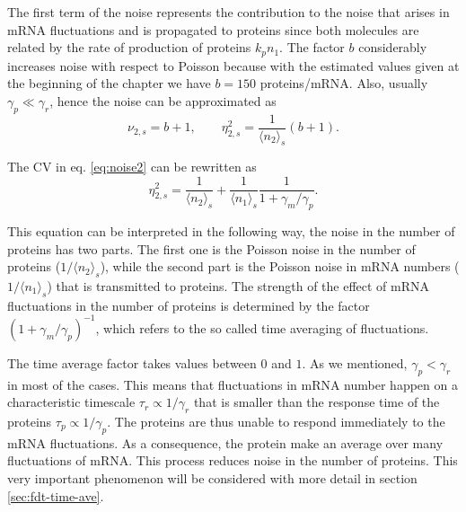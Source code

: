 The first term of the noise represents the contribution to the noise that arises in mRNA fluctuations and is propagated to proteins since both molecules are related by the rate of production of proteins $k_pn_1$. The factor $b$ considerably increases noise with respect to Poisson because with the estimated values given at the beginning of the chapter we have $b=150$ proteins/mRNA. Also, usually $\gamma_p \ll \gamma_r$, hence the noise can be approximated as
\begin{equation*}
  \nu_{2,s} = b+1, \quad \quad \eta_{2,s}^2 = \frac{1}{\langle n_2\rangle_s}\left(b+1\right).
\end{equation*}

The CV in eq. \eqref{eq:noise2} can be rewritten as
\begin{equation*}
  \eta_{2,s}^2 = \frac{1}{\langle n_2\rangle_s}+\frac{1}{\langle n_1\rangle_s}\frac{1}{1+\gamma_m/\gamma_p}.
\end{equation*}

This equation can be interpreted in the following way, the noise in the number of proteins has two parts. The first one is the Poisson noise in the number of proteins ($1/\langle n_2\rangle_s$), while the second part is the Poisson noise in mRNA numbers ($1/\langle n_1\rangle_s$) that is transmitted to proteins. The strength of the effect of mRNA fluctuations in the number of proteins is determined by the factor $(1+\gamma_m/\gamma_p)^{-1}$, which refers to the so called time averaging of fluctuations.

The time average factor takes values between $0$ and $1$. As we mentioned, $\gamma_p<\gamma_r$ in most of the cases. This means that fluctuations in mRNA number happen on a characteristic timescale $\tau_r \propto 1/\gamma_r$  that is smaller than the response time of the proteins $\tau_p \propto 1/\gamma_p$. The proteins are thus unable to respond immediately to the mRNA fluctuations. As a consequence, the protein make an average over many fluctuations of mRNA. This process reduces noise in the number of proteins. This very important phenomenon will be considered with more detail in section \ref{sec:fdt-time-ave}.

